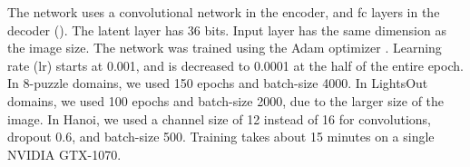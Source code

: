 \documentclass[11pt]{article}
\begin{document}
% 
% 
% 
% 
% 
% 


The network uses a convolutional network in the encoder, and fc layers
in the decoder (). The latent layer has 36 bits.
Input layer has the same dimension as the image size.
The network was trained using the Adam optimizer \cite{kingma2014adam}.
Learning rate (lr) starts at 0.001, and is decreased to 0.0001 at the half of the entire epoch.
In 8-puzzle domains, we used 150 epochs and batch-size 4000.
In LightsOut domains, we used 100 epochs and batch-size 2000, due to the larger size of the image.
In Hanoi, we used a channel size of 12 instead of 16 for convolutions, dropout 0.6, and batch-size 500.
Training takes about 15 minutes on a single NVIDIA GTX-1070.
\end{document}
